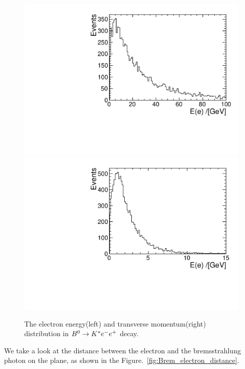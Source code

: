 \begin{figure}[!htbp]
  \begin{center}
    \includegraphics[width=0.49\linewidth]{Figures/06_ECAL/Brem/Electron_E.pdf}
    \includegraphics[width=0.49\linewidth]{Figures/06_ECAL/Brem/Electron_PT.pdf}
    \vspace*{-0.5cm}
  \end{center}
  \caption{
      The electron energy(left) and transverse momentum(right) distribution in ${{B}^0}\rightarrow{\ensuremath{{K}^*}}{\ensuremath{e^-}}{\ensuremath{e^+}}$ decay.
  }
  \label{fig:Brem_electron_E}
\end{figure}

We take a look at the distance between the electron and the bremsstrahlung photon on the \ecal plane,
as shown in the Figure.~\ref{fig:Brem_electron_distance}.

